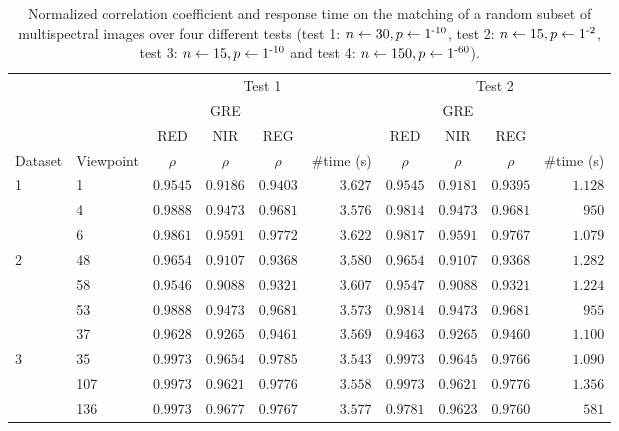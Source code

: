 \renewcommand{\arraystretch}{1.15}
\begin{table}
    \caption{Normalized correlation coefficient and response time on the matching of a random subset of multispectral images over four different tests (test 1: $n \gets 30, p \gets 1\textsuperscript{-10}$, test 2: $n \gets 15, p \gets 1\textsuperscript{-2}$, test 3: $n \gets 15, p \gets 1\textsuperscript{-10}$ and test 4: $n \gets 150, p \gets 1\textsuperscript{-60}$).}
    \label{table:multispectral_correlation_registration}
    \begin{tabular}{ll|cccr|cccr}
        \toprule
        \multicolumn{2}{c}{} & \multicolumn{4}{c}{Test 1} & \multicolumn{4}{c}{Test 2}\\
        \cmidrule{1-10}
        & & \multicolumn{3}{c}{GRE} & & \multicolumn{3}{c}{GRE} & \\
        & & RED & NIR & REG & & RED & NIR & REG\\
        Dataset & Viewpoint & $\rho$ & $\rho$ & $\rho$ & \#time (\si{\second}) & $\rho$ & $\rho$ & $\rho$ & \#time (\si{\second}) \\
        \cmidrule{1-10}
        \multirow{3}{*}{1} & 1 & $0.9545$ & $0.9186$ & $0.9403$ & $3.627$ & $0.9545$ & $0.9181$ & $0.9395$ & $1.128$\\
        & 4 & $0.9888$ & $0.9473$ & $0.9681$ & $3.576$ & $0.9814$ & $0.9473$ & $0.9681$ & $950$\\
        & 6 & $0.9861$ & $0.9591$ & $0.9772$ & $3.622$ & $0.9817$ & $0.9591$ & $0.9767$ & $1.079$\\
        \cmidrule{1-10}
        \multirow{4}{*}{2} & 48 & $0.9654$ & $0.9107$ & $0.9368$ & $3.580$ & $0.9654$ & $0.9107$ & $0.9368$ & $1.282$\\
        & 58 & $0.9546$ & $0.9088$ & $0.9321$ & $3.607$ & $0.9547$ & $0.9088$ & $0.9321$ & $1.224$\\
        & 53 & $0.9888$ & $0.9473$ & $0.9681$ & $3.573$ & $0.9814$ & $0.9473$ & $0.9681$ & $955$\\
        & 37 & $0.9628$ & $0.9265$ & $0.9461$ & $3.569$ & $0.9463$ & $0.9265$ & $0.9460$ & $1.100$\\
        \cmidrule{1-10}
        \multirow{8}{*}{3} & 35 & $0.9973$ & $0.9654$ & $0.9785$ & $3.543$ & $0.9973$ & $0.9645$ & $0.9766$ & $1.090$\\
        & 107 & $0.9973$ & $0.9621$ & $0.9776$ & $3.558$ & $0.9973$ & $0.9621$ & $0.9776$ & $1.356$\\
        & 136 & $0.9973$ & $0.9677$ & $0.9767$ & $3.577$ & $0.9781$ & $0.9623$ & $0.9760$ & $581$\\

\end{tabular}
\end{table}
